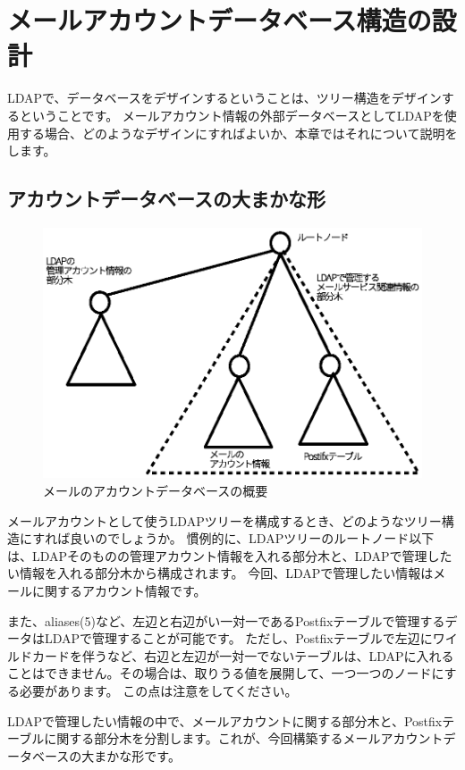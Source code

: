 \chapter{メールアカウントデータベース構造の設計}

LDAPで、データベースをデザインするということは、ツリー構造をデザインするということです。
メールアカウント情報の外部データベースとしてLDAPを使用する場合、どのようなデザインにすればよいか、本章ではそれについて説明をします。

\section{アカウントデータベースの大まかな形}

\begin{figure}[htbp]
	\includegraphics[width=12cm,clip]{draw/abstruct.eps}
	\caption{メールのアカウントデータベースの概要}
	\label{fig:abstruct}
\end{figure}

メールアカウントとして使うLDAPツリーを構成するとき、どのようなツリー構造にすれば良いのでしょうか。
慣例的に、LDAPツリーのルートノード以下は、LDAPそのものの管理アカウント情報を入れる部分木と、LDAPで管理したい情報を入れる部分木から構成されます。
今回、LDAPで管理したい情報はメールに関するアカウント情報です。

また、aliases(5)など、左辺と右辺がい一対一であるPostfixテーブルで管理するデータはLDAPで管理することが可能です。
ただし、Postfixテーブルで左辺にワイルドカードを伴うなど、右辺と左辺が一対一でないテーブルは、LDAPに入れることはできません。その場合は、取りうる値を展開して、一つ一つのノードにする必要があります。
この点は注意をしてください。

LDAPで管理したい情報の中で、メールアカウントに関する部分木と、Postfixテーブルに関する部分木を分割します。これが、今回構築するメールアカウントデータベースの大まかな形です。

